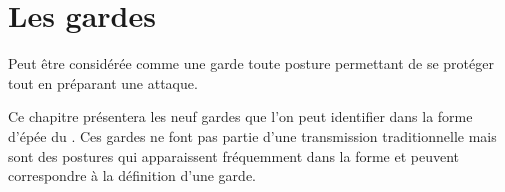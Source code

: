 \chapter{Les gardes}\label{ch:gardes}

Peut être considérée comme une garde toute posture permettant de se protéger tout en préparant une attaque.

Ce chapitre présentera les neuf gardes que l'on peut identifier dans la forme d'épée \Kunlun{} du \Yangjia{} \Michuan{}.
Ces gardes ne font pas partie d'une transmission traditionnelle mais sont des postures qui apparaissent fréquemment dans la forme et peuvent correspondre à la définition d'une garde. 